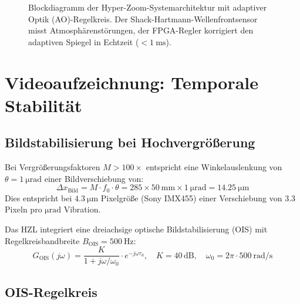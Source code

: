 ﻿\documentclass[12pt,a4paper]{article}
\theoremstyle{definition}
\begin{document}
\begin{figure}[H]
		\caption{Blockdiagramm der Hyper-Zoom-Systemarchitektur mit adaptiver Optik
			(AO)-Regelkreis. Der Shack-Hartmann-Wellenfrontsensor misst Atmosphärenstörungen,
			der FPGA-Regler korrigiert den adaptiven Spiegel in Echtzeit ($<\SI{1}{\milli\second}$).}
		\label{fig:system_arch}
	\end{figure}
	
	\section{Videoaufzeichnung: Temporale Stabilität}
	
	\subsection{Bildstabilisierung bei Hochvergrößerung}
	
	Bei Vergrößerungsfaktoren $M > 100\times$ entspricht eine Winkelauslenkung
	von $\theta = \SI{1}{\micro\radian}$ einer Bildverschiebung von:
	\begin{equation}
		\Delta x_\mathrm{Bild} = M\cdot f_0\cdot\theta
		= 285\times\SI{50}{\milli\metre}\times\SI{1}{\micro\radian}
		= \SI{14.25}{\micro\metre}
	\end{equation}
	Dies entspricht bei $\SI{4.3}{\micro\metre}$ Pixelgröße (Sony IMX455)
	einer Verschiebung von $3.3$ Pixeln pro $\si{\micro\radian}$ Vibration.
	
	Das HZL integriert eine dreiachsige optische Bildstabilisierung (OIS)
	mit Regelkreisbandbreite $B_\mathrm{OIS} = \SI{500}{\hertz}$:
	\begin{equation}
		G_\mathrm{OIS}(j\omega) = \frac{K}{1 + j\omega/\omega_0}
		\cdot e^{-j\omega\tau_d},
		\quad
		K = 40\,\mathrm{dB},\quad
		\omega_0 = 2\pi\cdot\SI{500}{\radian\per\second}
		\label{eq:ois_tf}
	\end{equation}
	
	\subsection{OIS-Regelkreis}
	
\end{document}
